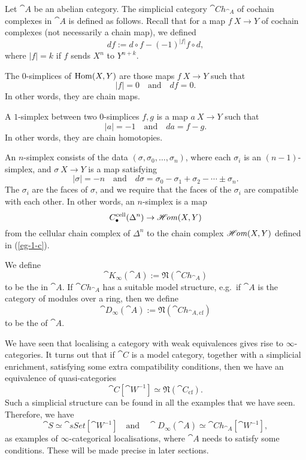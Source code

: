 \begin{example}
    Let $\cat A$ be an abelian category.
    The simplicial category $\cat{Ch}_{\cat A}$ of cochain complexes in $\cat A$
    is defined as follows.
    Recall that for a map $f\:X\to Y$ of cochain complexes (not necessarily a chain map),
    we defined 
    \[ df:=d\circ f-(-1)^{|f|}f\circ d, \]
    where $|f|=k$ if $f$ sends $X^n$ to $Y^{n+k}$.
    \begin{itms}
        \item The $0$-simplices of $\operatorname{Hom}(X,Y)$ are those maps $f\:X\to Y$
        such that 
        \[ |f|=0\quad\text{and}\quad df=0. \]
        In other words, they are chain maps.
        \item A $1$-simplex between two $0$-simplices $f,g$ is a map $a\:X\to Y$
        such that 
        \[ |a|=-1\quad\text{and}\quad da=f-g. \]
        In other words, they are chain homotopies.
        \item An $n$-simplex consists of the data $(\sigma,\sigma_0,\dotsc,\sigma_n)$,
        where each $\sigma_i$ is an $(n-1)$-simplex,
        and $\sigma\:X\to Y$ is a map satisfying
        \[ |\sigma|=-n\quad\text{and}\quad d\sigma=\sigma_0-\sigma_1+\sigma_2-\cdots\pm\sigma_n. \]
        The $\sigma_i$ are the faces of $\sigma$, and we require that
        the faces of the $\sigma_i$ are compatible with each other.
        In other words, an $n$-simplex is a map 
        \[ C_\bullet^{\textrm{cell}}(\Delta^n)\to\mathscr{H}\mkern-3mu\mathit{om}(X,Y) \]
        from the cellular chain complex of $\Delta^n$
        to the chain complex $\mathscr{H}\mkern-3mu\mathit{om}(X,Y)$ defined in (\ref{eg-1-c}).
    \end{itms}
    We define 
    \[\cat K_\infty(\cat A):=\mathfrak N(\cat{Ch}_{\cat A})\]
    to be the  in $\cat A$.
    If $\cat{Ch}_{\cat A}$ has a suitable model structure,
    e.g.\ if $\cat A$ is the category of modules over a ring, then we define 
    \[\cat D_\infty(\cat A):=\mathfrak N(\cat{Ch}_{\cat A,\mathrm{cf}})\]
    to be the  of $\cat A$. \varqed
\end{example}

\begin{remark} \label{rmk-4-locn}
    We have seen that localising a category with weak equivalences
    gives rise to $\infty$-categories.
    It turns out that if $\cat C$ is a model category,
    together with a simplicial enrichment,
    satisfying some extra compatibility conditions,
    then we have an equivalence of quasi-categories
    \[ \cat C[\cat W^{-1}]\simeq\mathfrak N(\cat C_{\mathrm{cf}}). \]
    Such a simplicial structure can be found in all the examples that we have seen.
    Therefore, we have
    \[ \cat S\simeq\cat{sSet}[\cat W^{-1}]\quad\text{and}\quad
    \cat D_\infty(\cat A)\simeq\cat{Ch}_{\cat A}[\cat W^{-1}], \]
    as examples of $\infty$-categorical localisations,
    where $\cat{A}$ needs to satisfy some conditions.
    These will be made precise in later sections. \varqed
\end{remark}
